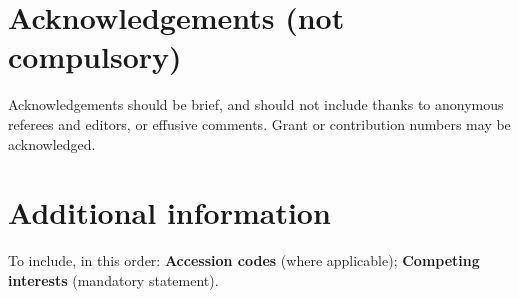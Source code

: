 \documentclass[11pt]{wlscirep}
\begin{document}



\section*{Acknowledgements (not compulsory)}

Acknowledgements should be brief, and should not include thanks to anonymous referees and editors, or effusive comments. Grant or contribution numbers may be acknowledged.



\section*{Additional information}

To include, in this order: \textbf{Accession codes} (where applicable); \textbf{Competing interests} (mandatory statement). 
\end{document}
